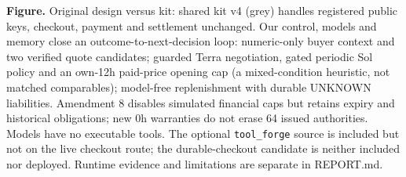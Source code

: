 \documentclass[a4paper]{article}
\begin{document}
\vspace{1mm}
\parbox{\linewidth}{\footnotesize\textbf{Figure.} Original design versus kit: shared kit v4 (grey) handles registered public keys, checkout, payment and settlement unchanged. Our control, models and memory close an outcome-to-next-decision loop: numeric-only buyer context and two verified quote candidates; guarded Terra negotiation, gated periodic Sol policy and an own-12h paid-price opening cap (a mixed-condition heuristic, not matched comparables); model-free replenishment with durable UNKNOWN liabilities. Amendment 8 disables simulated financial caps but retains expiry and historical obligations; new 0h warranties do not erase 64 issued authorities. Models have no executable tools. The optional \texttt{tool\_forge} source is included but not on the live checkout route; the durable-checkout candidate is neither included nor deployed. Runtime evidence and limitations are separate in REPORT.md.}
\end{document}
